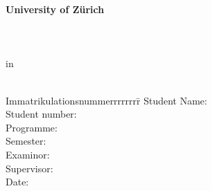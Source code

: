\begin{centering}
\Large \textbf{University of Zürich}\\
\Large \Chair \\
\vfill
\LARGE \textbf{\Title} \\
\vfill
\LARGE \Project\\ 
\Large in \\
\LARGE \Programme\\
\vfill
\begin{small}
\begin{doublespace}
	\begin{tabbing}
	Immatrikulationsnummerrrrrrrr\=\kill
	Student Name:\>\Name\\
	Student number:\>\MatrikelNummer\\
	Programme:\>\Programme\\
	Semester:\>\Semester\\
	Examinor:\>\Examinor\\
	Supervisor:\>\Supervisor\\
	Date:\>\Date
	\end{tabbing}
\end{doublespace}
\end{small}

\end{centering}\vspace{1cm}

